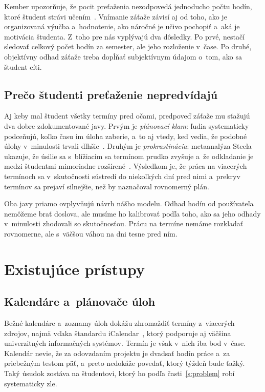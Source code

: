 \documentclass[10pt,twoside,slovak,a4paper]{article}
\begin{document}
Kember upozorňuje, že pocit preťaženia nezodpovedá jednoducho počtu hodín,
ktoré študent strávi učením~\cite{Kember:Workload}. Vnímanie záťaže závisí
aj od toho, ako je organizovaná výučba a~hodnotenie, ako náročné je učivo
pochopiť a~aká je motivácia študenta. Z~toho pre nás vyplývajú dva
dôsledky. Po prvé, nestačí sledovať celkový počet hodín za semester, ale jeho
rozloženie v~čase. Po druhé, objektívny odhad záťaže treba dopĺňať
subjektívnym údajom o~tom, ako sa študent cíti.

\subsection{Prečo študenti preťaženie nepredvídajú}

Aj keby mal študent všetky termíny pred očami, predpoveď záťaže mu sťažujú
dva dobre zdokumentované javy. Prvým je \emph{plánovací klam}: ľudia
systematicky podceňujú, koľko času im úloha zaberie, a~to aj vtedy, keď
vedia, že podobné úlohy v~minulosti trvali dlhšie~\cite{Buehler:Planning}.
Druhým je \emph{prokrastinácia}: metaanalýza Steela ukazuje, že úsilie sa
s~blížiacim sa termínom prudko zvyšuje a~že odkladanie je medzi študentmi
mimoriadne rozšírené~\cite{Steel:Procrastination}. Výsledkom je, že práca na
viacerých termínoch sa v~skutočnosti sústredí do niekoľkých dní pred nimi
a~prekryv termínov sa prejaví silnejšie, než by naznačoval rovnomerný plán.

Oba javy priamo ovplyvňujú návrh nášho modelu. Odhad hodín od používateľa
nemôžeme brať doslova, ale musíme ho kalibrovať podľa toho, ako sa jeho
odhady v~minulosti zhodovali so skutočnosťou. Prácu na termíne nemáme
rozkladať rovnomerne, ale s~väčšou váhou na dni tesne pred ním.



\section{Existujúce prístupy} \label{s:pristupy}

\subsection{Kalendáre a~plánovače úloh}

Bežné kalendáre a~zoznamy úloh dokážu zhromaždiť termíny z~viacerých zdrojov,
najmä vďaka štandardu iCalendar~\cite{RFC5545}, ktorý podporuje aj väčšina
univerzitných informačných systémov. Termín je však v~nich iba bod v~čase.
Kalendár nevie, že za odovzdaním projektu je dvadsať hodín práce a~za
priebežným testom päť, a~preto nedokáže povedať, ktorý týždeň bude ťažký.
Taký úsudok zostáva na študentovi, ktorý ho podľa
časti~\ref{s:problem} robí systematicky zle.
\end{document}
